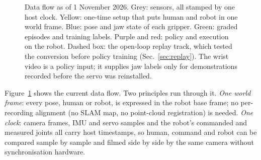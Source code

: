 \documentclass[conference,10pt]{IEEEtran}
\begin{document}
\begin{figure}[!t]
\caption{Data flow as of 1 November 2026. Grey: sensors, all stamped by one host clock. Yellow: one-time setup that
puts human and robot in one world frame. Blue: pose and jaw state of each gripper. Green: graded episodes and training
labels. Purple and red: policy and execution on the robot. Dashed box: the open-loop replay track, which tested the
conversion before policy training (Sec.~\ref{sec:replay}). The wrist video is a policy input; it supplies jaw labels only
for demonstrations recorded before the servo was reinstalled.}
\label{fig:pipe}
\end{figure}

Figure~\ref{fig:pipe} shows the current data flow. Two principles run through it. \emph{One world frame}: every pose,
human or robot, is expressed in the robot base frame; no per-recording alignment (no SLAM map, no point-cloud
registration) is needed. \emph{One clock}: camera frames, IMU and servo samples and the robot's commanded and measured
joints all carry host timestamps, so human, command and robot can be compared sample by sample and filmed side by side
by the same camera without synchronisation hardware.

\end{document}
